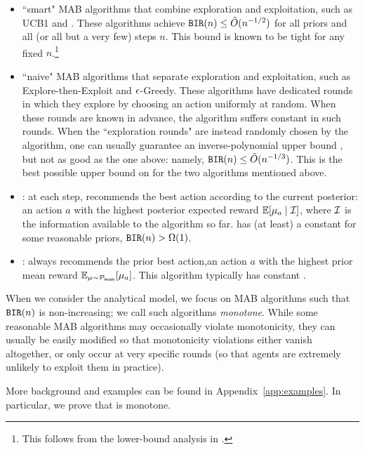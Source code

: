 \begin{itemize}
\item ``smart" MAB algorithms that combine exploration and exploitation, such as UCB1 \cite{bandits-ucb1} and . These algorithms achieve
        $\mathtt{BIR}(n) \leq  \tilde{O}(n^{-1/2})$
    for all priors and all (or all but a very few) steps $n$. This bound is known to be tight for any fixed $n$.\footnote{This follows from the lower-bound analysis in \cite{bandits-exp3}.}

\item ``naive" MAB algorithms that separate exploration and exploitation, such as Explore-then-Exploit and $\epsilon$-Greedy. These algorithms have dedicated rounds in which they explore by choosing an action uniformly at random. When these rounds are known in advance, the algorithm suffers constant \BIR in such rounds. When the ``exploration rounds" are instead randomly chosen by the algorithm, one can usually guarantee an inverse-polynomial upper bound \BIR, but not as good as the one above: namely,
        $ \mathtt{BIR}(n) \leq \tilde{O}(n^{-1/3})$.
    This is the best possible upper bound on \BIR for the two algorithms mentioned above.

\item \DynGreedy: at each step, recommends the best action according to the current posterior: an action $a$ with the highest posterior expected reward
        $\E[\mu_a \mid \mI]$,
     where $\mathcal{I}$ is the information available to the algorithm so far.
     \DynGreedy has (at least) a constant \BIR for some reasonable priors, \ie
        $\mathtt{BIR}(n)>\Omega(1)$.

\item \StaticGreedy: always recommends the prior best action,\ie an action $a$ with the highest prior mean reward  $\E_{\mu\sim \priorMu}[\mu_a]$. This algorithm typically has constant \BIR.
\end{itemize}

When we consider the analytical model, we focus on MAB algorithms such that $\mathtt{BIR}(n)$ is non-increasing; we call such algorithms \emph{monotone}. While some reasonable MAB algorithms may occasionally violate monotonicity, they can usually be easily modified so that monotonicity violations either vanish altogether, or only occur at very specific rounds (so that agents are extremely unlikely to exploit them in practice).

More background and examples can be found in Appendix~\ref{app:examples}. In particular, we prove that \DynGreedy is monotone.

